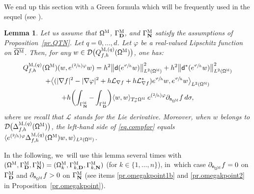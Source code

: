 \documentclass[JEP,XML,SOM,Unicode,NoEqCountersInSection,NoFloatCountersInSection,published]{cedram}
\newcommand{\Psfrac}[2]{(\sfrac{#1}{#2})}
\newcommand{\mbf}[1]{\mathbf{#1}}
\theoremstyle{plain}
\newtheorem{lemma}[proposition]{Lemma}
\theoremstyle{definition}
\begin{document}
We end up this section with a Green formula which will be frequently
used in the sequel (see \cite[Lem.\,2.10]{peutrec2020bar}).
\begin{lemma}
\label{le.GreenWeak}
Let us assume that $\mathsf \Omega^{\textsc{M}}$, $\Gamma^{\textsc{M}}_{\mbf D}$, and $\Gamma^{\textsc{M}}_{\mbf N}$ satisfy the assumptions of Proposition~\ref{pr.QTN}. Let $q=0,\ldots,d$.
Let $\varphi$ be a real-valued Lipschitz
function on $\overline{\mathsf \Omega^{\textsc{M}}}$. Then, for any
$w\in \mathcal D\bigl(Q^{\textsc{M},(q)}_{f,h} (\mathsf
\Omega^{\textsc{M}})\bigr)$, one has:\vspace*{-4pt}\enlargethispage{.5\baselineskip}
\begin{multline}
\label{eq.compfor}
{Q}^{\textsc{M},(q)}_{f,h} (\mathsf \Omega^{\textsc{M}})(w,e^{\Psfrac 2h \varphi} w)=
h^{2}\big \| \mathsf d (e^{\sfrac{\varphi}{h}} w)\big \|^{2}_{ L^{2} (\mathsf \Omega^{\textsc{M}})}+
h^{2} \big \| \mathsf d^{*} (e^{\sfrac{\varphi}{h}} w) \big \|^{2}_{ L^{2} (\mathsf \Omega^{\textsc{M}})}\\
+ \big \langle
(|\nabla f|^{2}-|\nabla \varphi|^{2}+h\mathcal{L}_{\nabla
f}+h\mathcal{L}_{\nabla
f}^{*})e^{\sfrac{\varphi}{h}} w, e^{\sfrac{\varphi}{h}}
w\big \rangle_{ L^{2} (\mathsf \Omega^{\textsc{M}})}\\
+h \biggl(\int_{\Gamma^{\textsc{M}}_{\mbf N}} - \int_{\Gamma^{\textsc{M}}_{\mbf D}}\biggr)
\langle w,w
\rangle_{ T_{\sigma}^{*}\mathsf \Omega^{\textsc{M}}}\;e^{\Psfrac{2 }{h}\varphi }\partial_{\mathsf n_{ \mathsf \Omega^{\textsc{M}} } }
f\, d\sigma,
\end{multline}
where we recall that $\mathcal{L}$ stands for the Lie derivative.
Moreover, when $w$ belongs to $\mathcal D\bigl(\Delta_{f,h}^{\textsc{M},(q)} (\mathsf \Omega^{\textsc{M}})\bigr)$, the left-hand
side of \eqref{eq.compfor} equals $\langle
e^{\Psfrac 2h \varphi}\Delta_{f,h}^{\textsc{M},(q)} (\mathsf \Omega^{\textsc{M}}) w,w\rangle_{L^{2} (\mathsf \Omega^{\textsc{M}})}$.
\end{lemma}
In the following, we~will use this lemma several times with $(\mathsf
\Omega^{\textsc{M}}, \Gamma^{\textsc{M}}_{\mbf D},
\Gamma^{\textsc{M}}_{\mbf N}) = (\mathsf \Omega_k^{\textsc{M}},
\Gamma_{k,\mbf D}^{\textsc{M}}, \Gamma_{k,\mbf N}^{\textsc{M}})$ (for
$k \in \{1, \ldots,n\}$), in~which case $\partial_{\mathsf n_{ \mathsf \Omega^{\textsc{M}}}}f=0$ on
$\Gamma^{\textsc{M}}_{\mbf D}$ and $\partial_{\mathsf n_{ \mathsf \Omega^{\textsc{M}}}}f>0$ on
$\Gamma^{\textsc{M}}_{\mbf N}$ (see items \eqref{pr.omegakpoint1b} and \eqref{pr.omegakpoint2} in Proposition~\ref{pr.omegakpoint}).
\end{document}
